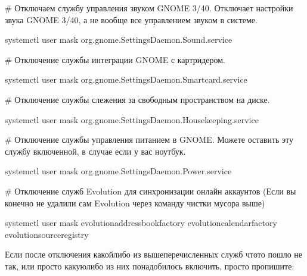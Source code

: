 \documentclass[letterpaper,10pt,russian,openany]{sphinxmanual}
\begin{document}
\sphinxAtStartPar
\# Отключаем службу управления звуком GNOME 3/40.
Отключает  настройки звука GNOME 3/40, а не вообще все управлением звуком в системе.

\begin{sphinxVerbatim}[commandchars=\\\{\}]
systemctl \PYGZhy{}\PYGZhy{}user mask org.gnome.SettingsDaemon.Sound.service
\end{sphinxVerbatim}

\sphinxAtStartPar
\# Отключение службы интеграции GNOME с картридером.

\begin{sphinxVerbatim}[commandchars=\\\{\}]
systemctl \PYGZhy{}\PYGZhy{}user mask org.gnome.SettingsDaemon.Smartcard.service
\end{sphinxVerbatim}

\sphinxAtStartPar
\# Отключение службы слежения за свободным пространством на диске.

\begin{sphinxVerbatim}[commandchars=\\\{\}]
systemctl \PYGZhy{}\PYGZhy{}user mask org.gnome.SettingsDaemon.Housekeeping.service
\end{sphinxVerbatim}

\sphinxAtStartPar
\# Отключение службы управления питанием в GNOME.
Можете оставить эту службу включенной, в случае если у вас ноутбук.

\begin{sphinxVerbatim}[commandchars=\\\{\}]
systemctl \PYGZhy{}\PYGZhy{}user mask org.gnome.SettingsDaemon.Power.service
\end{sphinxVerbatim}

\sphinxAtStartPar
\# Отключение служб Evolution для синхронизации онлайн аккаунтов
(Если вы конечно не удалили сам Evolution через команду чистки мусора выше)

\begin{sphinxVerbatim}[commandchars=\\\{\}]
systemctl \PYGZhy{}\PYGZhy{}user mask evolution\PYGZhy{}addressbook\PYGZhy{}factory evolution\PYGZhy{}calendar\PYGZhy{}factory evolution\PYGZhy{}source\PYGZhy{}registry
\end{sphinxVerbatim}

\sphinxAtStartPar
Если после отключения какой\sphinxhyphen{}либо из вышеперечисленных служб что\sphinxhyphen{}то пошло не так,
или просто какую\sphinxhyphen{}либо из них понадобилось включить, просто пропишите:
\end{document}

